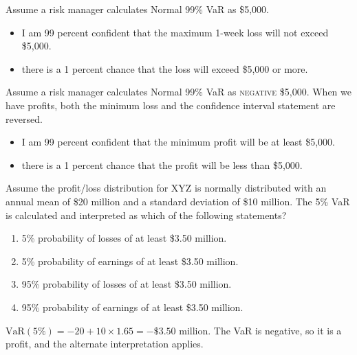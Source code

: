 \begin{mrdefbox}[title={1. Standard interpretation --- VaR is a loss}]
Assume a risk manager calculates Normal 99\% VaR as \$5,000.
\begin{itemize}
\item {} I am 99 percent confident that the maximum 1-week loss will not
      exceed \$5,000.
\item {} there is a 1 percent chance that the loss will exceed \$5,000
      or more.
\end{itemize}
\end{mrdefbox}

\begin{mrdefbox}[title={2. Alternate interpretation --- VaR is negative, so it is a profit}]
Assume a risk manager calculates Normal 99\% VaR as \textsc{negative} \$5,000. When we have
profits, both the minimum loss and the confidence interval statement are reversed.
\begin{itemize}
\item {} I am 99 percent confident that the minimum profit will be at
      least \$5,000.
\item {} there is a 1 percent chance that the profit will be less than
      \$5,000.
\end{itemize}
\end{mrdefbox}

\begin{mrexbox}[title={Example 4 --- interpreting a negative VaR}]
Assume the profit/loss distribution for XYZ is normally distributed with an annual mean of
\$20 million and a standard deviation of \$10 million. The 5\% VaR is calculated and interpreted
as which of the following statements?
\begin{enumerate}[label=\Alph*.,leftmargin=1.7em]
\item 5\% probability of losses of at least \$3.50 million.
\item 5\% probability of earnings of at least \$3.50 million.
\item 95\% probability of losses of at least \$3.50 million.
\item 95\% probability of earnings of at least \$3.50 million.
\end{enumerate}
\tcblower
\small
$\mathrm{VaR}(5\%) = -20 + 10 \times 1.65 = -\$3.50$ million. The VaR is negative, so it is a
profit, and the alternate interpretation applies. 
\end{mrexbox}

